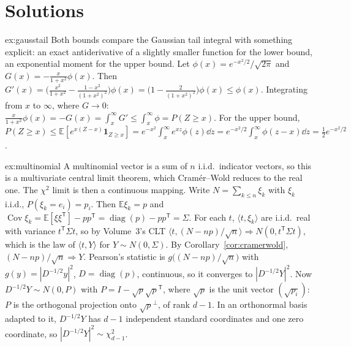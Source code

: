 \section{Solutions}

\begin{solution}{ex:gausstail}
\idea Both bounds compare the Gaussian tail integral with something explicit: an exact antiderivative of a slightly smaller function for the lower bound, an exponential
moment for the upper bound.
\writeup Let $\phi(x)=e^{-x^2/2}/\sqrt{2\pi}$ and $G(x)=-\frac x{1+x^2}\phi(x)$. Then $G'(x)=\bigl(\frac{x^2}{1+x^2}-\frac{1-x^2}{(1+x^2)^2}\bigr)\phi(x)=\bigl(1-\frac2{(1+x^2)^2}\bigr)\phi(x)\le\phi(x)$. Integrating
from $x$ to $\infty$, where $G\to0$: $\frac x{1+x^2}\phi(x)=-G(x)=\int_x^\infty G'\le\int_x^\infty\phi=P(Z\ge x)$. For the upper bound, $P(Z\ge x)\le\mathbb E[e^{x(Z-x)}\mathbf 1_{Z\ge x}]=
e^{-x^2}\int_x^\infty e^{xz}\phi(z)\dd z=e^{-x^2/2}\int_x^\infty\phi(z-x)\dd z=\frac12e^{-x^2/2}$.
\end{solution}

\begin{solution}{ex:multinomial}
\idea A multinomial vector is a sum of $n$ i.i.d.\ indicator vectors, so this is a multivariate central limit theorem, which Cram\'er--Wold reduces to the real one. The
$\chi^2$ limit is then a continuous mapping.
\writeup Write $N=\sum_{k\le n}\xi_k$ with $\xi_k$ i.i.d., $P(\xi_k=e_i)=p_i$. Then $\mathbb E\xi_k=p$ and $\operatorname{Cov}\xi_k=\mathbb E[\xi\xi^{\mathsf T}]-pp^{\mathsf T}=\operatorname{diag}(p)-pp^{\mathsf T}=\Sigma$. For each
$t$, $\langle t,\xi_k\rangle$ are i.i.d.\ real with variance $t^{\mathsf T}\Sigma t$, so by Volume~3's CLT $\langle t,(N-np)/\sqrt n\rangle\Rightarrow N(0,t^{\mathsf T}\Sigma t)$, which is the law of
$\langle t,Y\rangle$ for $Y\sim N(0,\Sigma)$. By Corollary~\ref{cor:cramerwold}, $(N-np)/\sqrt n\Rightarrow Y$. Pearson's statistic is $g\bigl((N-np)/\sqrt n\bigr)$ with $g(y)=|D^{-1/2}y|^2$,
$D=\operatorname{diag}(p)$, continuous, so it converges to $|D^{-1/2}Y|^2$. Now $D^{-1/2}Y\sim N(0,P)$ with $P=I-\sqrt p\sqrt p^{\mathsf T}$, where $\sqrt p$ is the unit vector $(\sqrt{p_i})$:
$P$ is the orthogonal projection onto $\sqrt p^\perp$, of rank $d-1$. In an orthonormal basis adapted to it, $D^{-1/2}Y$ has $d-1$ independent standard coordinates and one zero coordinate,
so $|D^{-1/2}Y|^2\sim\chi^2_{d-1}$.
\end{solution}

